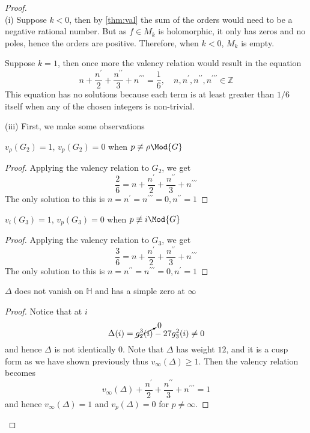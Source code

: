 \documentclass[12pt]{article}
\theoremstyle{definition}
\begin{document}
\begin{proof}~\\
(i) Suppose \(k<0\), then by \cref{thm:val} the sum of the orders would need to be a negative rational number. But as \(f \in M_k\) is holomorphic, it only has zeros and no poles, hence the orders are positive. Therefore, when \(k<0\), \(M_k\) is empty.

Suppose \(k=1\), then once more the valency relation would result in the equation
\[
    n + \frac{n^{\prime} }{2} + \frac{n^{\prime\prime} }{3} +n^{\prime\prime\prime} = \frac{1}{6},\quad n,n^{\prime} ,n^{\prime\prime},n^{\prime\prime\prime} \in \mathbb{Z} 
\]
This equation has no solutions because each term is at least greater than \(1/6\) itself when any of the chosen integers is non-trivial. 


(iii) First, we make some observations
\begin{claim}
    \(v_{\rho }(G_2) =1 \), \(v_p(G_2)=0\) when \(p \not\equiv \rho \Mod{G}\)   
\end{claim}
\begin{proof}
Applying the valency relation to \(G_2\), we get
\[
    \frac{2}{6} = n + \frac{n^{\prime} }{2}+\frac{n^{\prime\prime} }{3} + n^{\prime\prime\prime} 
\] 
The only solution to this is \(n=n^{\prime} =n^{\prime\prime\prime} =0,n^{\prime\prime} =1\) 
\end{proof}

\begin{claim}
    \(v_i(G_3)=1\), \(v_p(G_3)=0\) when \(p \not\equiv i \Mod{G}\)    
\end{claim}
\begin{proof}
Applying the valency relation to \(G_3\), we get
\[
    \frac{3}{6} = n + \frac{n^{\prime} }{2}+\frac{n^{\prime\prime} }{3} + n^{\prime\prime\prime} 
\] 
The only solution to this is \(n=n^{\prime\prime} =n^{\prime\prime\prime} =0,n^{\prime} =1\) 
\end{proof}

\begin{claim}
    \(\Delta \) does not vanish on \(\mathbb{H} \) and has a simple zero at \(\infty \)   
\end{claim}
\begin{proof}
Notice that at \(i\) 
\[
    \Delta (i) = \cancelto{0}{g_2^3(i)} -27g_3^2(i) \ne 0
\]
and hence \(\Delta \) is not identically \(0\). Note that \(\Delta \) has weight \(12\), and it is a cusp form as we have shown previously thus \(v_\infty (\Delta )\geq 1\). Then the valency relation becomes 
\[
    v_\infty (\Delta ) + \frac{n^{\prime} }{2}+\frac{n^{\prime\prime} }{3} + n^{\prime\prime\prime} =1
\]  
and hence \(v_\infty (\Delta ) =1\) and \(v_p(\Delta )=0\) for \(p \ne \infty \).   
\end{proof}


\end{proof}
\end{document}
